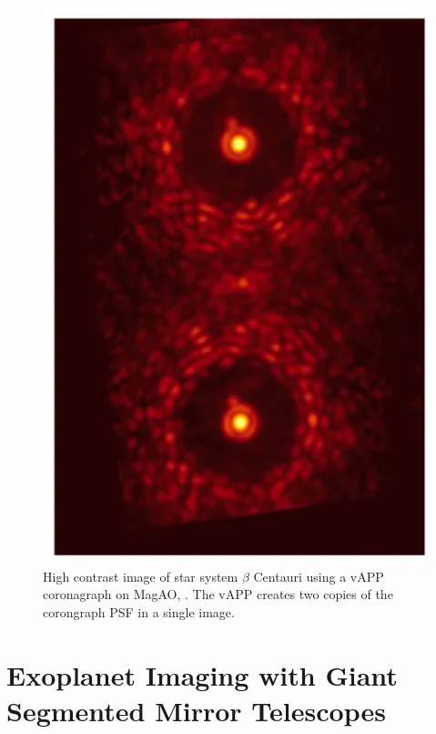 \begin{figure}
    \centering
    \includegraphics{Chapter Materials/Introduction Materials/BetaCen.png}
    \caption{High contrast image of star system $\beta$ Centauri using a vAPP coronagraph on MagAO, \citep{close2018status}. The vAPP creates two copies of the corongraph PSF in a single image. }
    \label{fig:BetaCen}
\end{figure}



\section{Exoplanet Imaging with Giant Segmented Mirror Telescopes}


